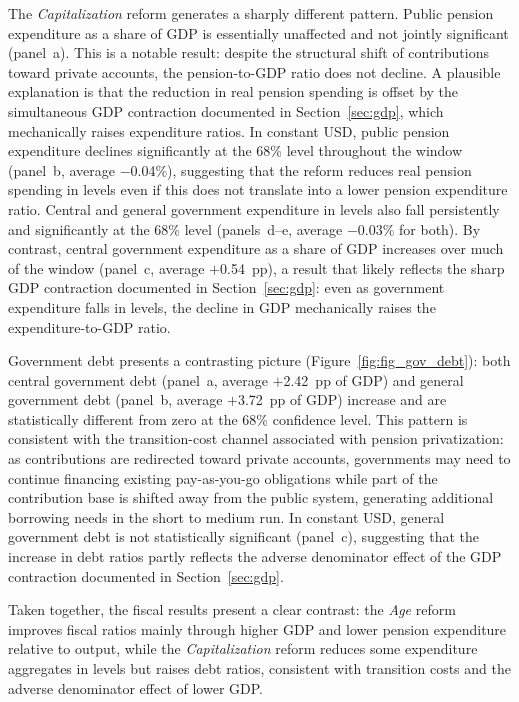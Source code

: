 \documentclass[11pt,english,a4paper, twoside, authoryear]{article}
\begin{document}
The \textit{Capitalization} reform generates a sharply different pattern. Public pension expenditure as a share of GDP is essentially unaffected and not jointly significant (panel~a). This is a notable result: despite the structural shift of contributions toward private accounts, the pension-to-GDP ratio does not decline. A plausible explanation is that the reduction in real pension spending is offset by the simultaneous GDP contraction documented in Section~\ref{sec:gdp}, which mechanically raises expenditure ratios. In constant USD, public pension expenditure declines significantly at the 68\% level throughout the window (panel~b, average $-$0.04\%), suggesting that the reform reduces real pension spending in levels even if this does not translate into a lower pension expenditure ratio. Central and general government expenditure in levels also fall persistently and significantly at the 68\% level (panels~d--e, average $-$0.03\% for both). By contrast, central government expenditure as a share of GDP increases over much of the window (panel~c, average $+$0.54~pp), a result that likely reflects the sharp GDP contraction documented in Section~\ref{sec:gdp}: even as government expenditure falls in levels, the decline in GDP mechanically raises the expenditure-to-GDP ratio.

Government debt presents a contrasting picture (Figure~\ref{fig:fig_gov_debt}): both central government debt (panel~a, average $+$2.42~pp of GDP) and general government debt (panel~b, average $+$3.72~pp of GDP) increase and are statistically different from zero at the 68\% confidence level. This pattern is consistent with the transition-cost channel associated with pension privatization: as contributions are redirected toward private accounts, governments may need to continue financing existing pay-as-you-go obligations while part of the contribution base is shifted away from the public system, generating additional borrowing needs in the short to medium run. In constant USD, general government debt is not statistically significant (panel~c), suggesting that the increase in debt ratios partly reflects the adverse denominator effect of the GDP contraction documented in Section~\ref{sec:gdp}. %

Taken together, the fiscal results present a clear contrast: the \textit{Age} reform improves fiscal ratios mainly through higher GDP and lower pension expenditure relative to output, while the \textit{Capitalization} reform reduces some expenditure aggregates in levels but raises debt ratios, consistent with transition costs and the adverse denominator effect of lower GDP.
\end{document}
